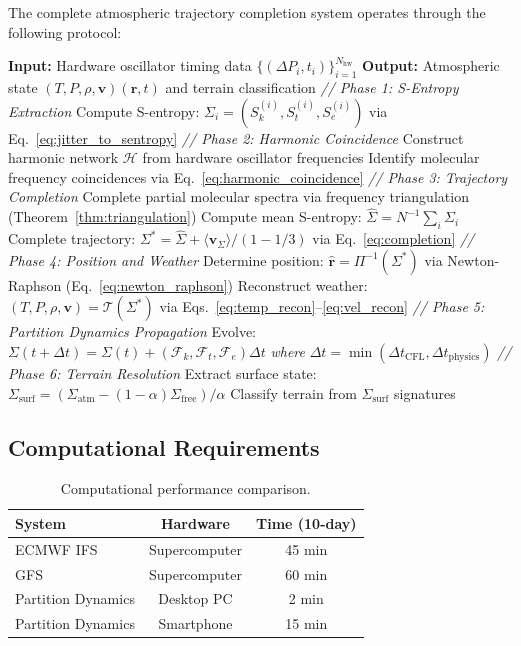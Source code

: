 \documentclass[twocolumn,10pt]{article}
\theoremstyle{definition}
\newcommand{\Sk}{S_k}
\newcommand{\St}{S_t}
\newcommand{\Se}{S_e}
\begin{document}
The complete atmospheric trajectory completion system operates through the following protocol:

\begin{algorithm}[H]
\caption{Atmospheric Trajectory Completion}
\label{alg:main}
\begin{algorithmic}[1]
\STATE \textbf{Input:} Hardware oscillator timing data $\{(\Delta P_i, t_i)\}_{i=1}^{N_{\mathrm{hw}}}$
\STATE \textbf{Output:} Atmospheric state $(T, P, \rho, \mathbf{v})(\mathbf{r}, t)$ and terrain classification
\STATE
\STATE \textit{// Phase 1: S-Entropy Extraction}
    \STATE Compute S-entropy: $\Sigma_i = (\Sk^{(i)}, \St^{(i)}, \Se^{(i)})$ via Eq.~\eqref{eq:jitter_to_sentropy}
\ENDFOR
\STATE
\STATE \textit{// Phase 2: Harmonic Coincidence}
\STATE Construct harmonic network $\mathcal{H}$ from hardware oscillator frequencies
\STATE Identify molecular frequency coincidences via Eq.~\eqref{eq:harmonic_coincidence}
\STATE
\STATE \textit{// Phase 3: Trajectory Completion}
\STATE Complete partial molecular spectra via frequency triangulation (Theorem~\ref{thm:triangulation})
\STATE Compute mean S-entropy: $\hat{\Sigma} = N^{-1}\sum_i\Sigma_i$
\STATE Complete trajectory: $\Sigma^* = \hat{\Sigma} + \langle\mathbf{v}_\Sigma\rangle/(1 - 1/3)$ via Eq.~\eqref{eq:completion}
\STATE
\STATE \textit{// Phase 4: Position and Weather}
\STATE Determine position: $\hat{\mathbf{r}} = \Pi^{-1}(\Sigma^*)$ via Newton-Raphson (Eq.~\eqref{eq:newton_raphson})
\STATE Reconstruct weather: $(T, P, \rho, \mathbf{v}) = \mathcal{T}(\Sigma^*)$ via Eqs.~\eqref{eq:temp_recon}--\eqref{eq:vel_recon}
\STATE
\STATE \textit{// Phase 5: Partition Dynamics Propagation}
\STATE Evolve: $\Sigma(t + \Delta t) = \Sigma(t) + (\mathcal{F}_k, \mathcal{F}_t, \mathcal{F}_e)\Delta t$
\STATE \textit{where} $\Delta t = \min(\Delta t_{\mathrm{CFL}}, \Delta t_{\mathrm{physics}})$
\STATE
\STATE \textit{// Phase 6: Terrain Resolution}
\STATE Extract surface state: $\Sigma_{\mathrm{surf}} = (\Sigma_{\mathrm{atm}} - (1-\alpha)\Sigma_{\mathrm{free}})/\alpha$
\STATE Classify terrain from $\Sigma_{\mathrm{surf}}$ signatures
\end{algorithmic}
\end{algorithm}

\subsection{Computational Requirements}

\begin{table}[h]
\centering
\caption{Computational performance comparison.}
\label{tab:performance}
\begin{tabular}{@{}lcc@{}}
\toprule
\textbf{System} & \textbf{Hardware} & \textbf{Time (10-day)} \\
\midrule
ECMWF IFS & Supercomputer & 45 min \\
GFS & Supercomputer & 60 min \\
Partition Dynamics & Desktop PC & 2 min \\
Partition Dynamics & Smartphone & 15 min \\
\bottomrule
\end{tabular}
\end{table}
\end{document}
